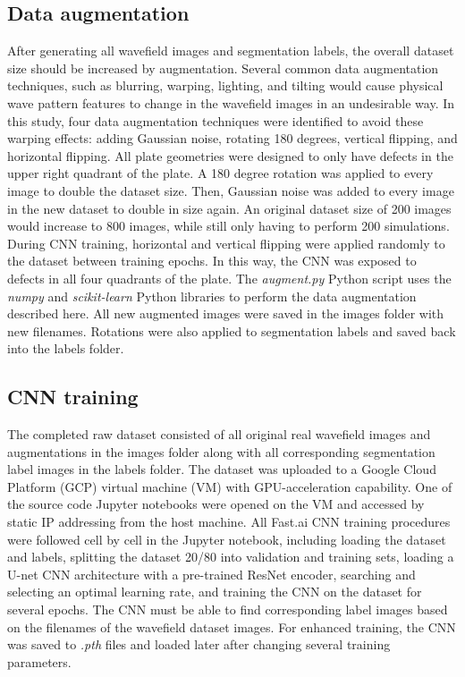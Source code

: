 \documentclass[11pt,letterpaper]{article}
\begin{document}
		\subsection{Data augmentation}
		After generating all wavefield images and segmentation labels, the overall dataset size should be increased by augmentation. Several common data augmentation techniques, such as blurring, warping, lighting, and tilting would cause physical wave pattern features to change in the wavefield images in an undesirable way. In this study, four data augmentation techniques were identified to avoid these warping effects: adding Gaussian noise, rotating 180 degrees, vertical flipping, and horizontal flipping. All plate geometries were designed to only have defects in the upper right quadrant of the plate. A 180 degree rotation was applied to every image to double the dataset size. Then, Gaussian noise was added to every image in the new dataset to double in size again. An original dataset size of 200 images would increase to 800 images, while still only having to perform 200 simulations. During CNN training, horizontal and vertical flipping were applied randomly to the dataset between training epochs. In this way, the CNN was exposed to defects in all four quadrants of the plate. The \textit{augment.py} Python script uses the \textit{numpy} and \textit{scikit-learn} Python libraries to perform the data augmentation described here. All new augmented images were saved in the images folder with new filenames. Rotations were also applied to segmentation labels and saved back into the labels folder.
		\subsection{CNN training}
		The completed raw dataset consisted of all original real wavefield images and augmentations in the images folder along with all corresponding segmentation label images in the labels folder. The dataset was uploaded to a Google Cloud Platform (GCP) virtual machine (VM) with GPU-acceleration capability. One of the source code Jupyter notebooks were opened on the VM and accessed by static IP addressing from the host machine. All Fast.ai CNN training procedures were followed cell by cell in the Jupyter notebook, including loading the dataset and labels, splitting the dataset 20/80 into validation and training sets, loading a U-net CNN architecture with a pre-trained ResNet encoder, searching and selecting an optimal learning rate, and training the CNN on the dataset for several epochs. The CNN must be able to find corresponding label images based on the filenames of the wavefield dataset images. For enhanced training, the CNN was saved to \textit{.pth} files and loaded later after changing several training parameters. \bigskip
		
\end{document}
